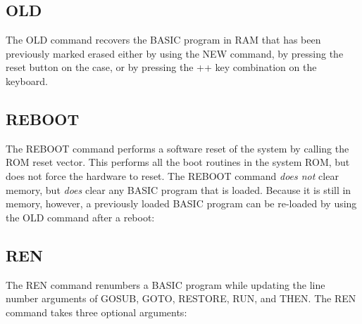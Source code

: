 \subsection{OLD}

 The {\ttfamily OLD} command recovers the BASIC program in RAM that has been
 previously marked erased either by using the {\ttfamily NEW} command, by
 pressing the reset button on the case, or by pressing the
 ++
 key combination on the keyboard.\\

\subsection{REBOOT}

The {\ttfamily REBOOT} command performs a software reset of the system by
calling the ROM reset vector.  This performs all the boot routines in the
system ROM, but does not force the hardware to reset.  The {\ttfamily REBOOT}
command {\em does not} clear memory, but {\em does} clear any BASIC program
that is loaded.  Because it is still in memory, however, a previously loaded
BASIC program can be re-loaded by using the {\ttfamily OLD} command after a
reboot:\\


\subsection{REN}

The {\ttfamily REN} command renumbers a BASIC program while updating the line
number arguments of {\ttfamily GOSUB}, {\ttfamily GOTO}, {\ttfamily RESTORE},
{\ttfamily RUN}, and {\ttfamily THEN}.  The {\ttfamily REN} command takes three
optional arguments:\\

